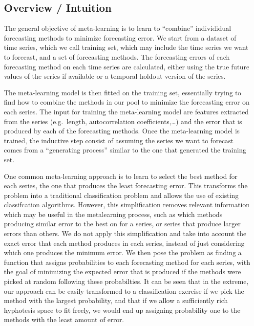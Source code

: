 \documentclass[11pt,a4paper,]{article}
\theoremstyle{definition}
\theoremstyle{definition}
\theoremstyle{definition}
\theoremstyle{remark}
\begin{document}
\subsection{Overview / Intuition}\label{overview-intuition}

The general objective of meta-learning is to learn to ``combine''
individidual forecasting methods to minimize forecasting error. We start
from a dataset of time series, which we call training set, which may
include the time series we want to forecast, and a set of forecasting
methods. The forecasting errors of each forecasting method on each time
series are calculated, either using the true future values of the series
if available or a temporal holdout version of the series.

The meta-learning model is then fitted on the training set, essentially
trying to find how to combine the methods in our pool to minimize the
forecasting error on each series. The input for training the
meta-learning model are features extracted from the series (e.g.~length,
autocorrelation coefficients,\ldots{}) and the error that is produced by
each of the forecasting methods. Once the meta-learning model is
trained, the inductive step consist of assuming the series we want to
forecast comes from a ``generating process'' similar to the one that
generated the training set.

One common meta-learning approach is to learn to select the best method
for each series, the one that produces the least forecasting error. This
transforms the problem into a traditional classification problem and
allows the use of existing classifcation algorithms. However, this
simplification removes relevant information which may be useful in the
metalearning process, such as which methods producing similar error to
the best on for a series, or series that produce larger errors than
others. We do not apply this simplification and take into account the
exact error that each method produces in each series, instead of just
considering which one produces the minimum error. We then pose the
problem as finding a function that assigns probabilities to each
forecasting method for each series, with the goal of minimizing the
expected error that is produced if the methods were picked at random
following these probabilties. It can be seen that in the extreme, our
approach can be easily transformed to a classification exercise if we
pick the method with the largest probability, and that if we allow a
sufficiently rich hyphotesis space to fit freely, we would end up
assigning probability one to the methods with the least amount of error.
\end{document}
